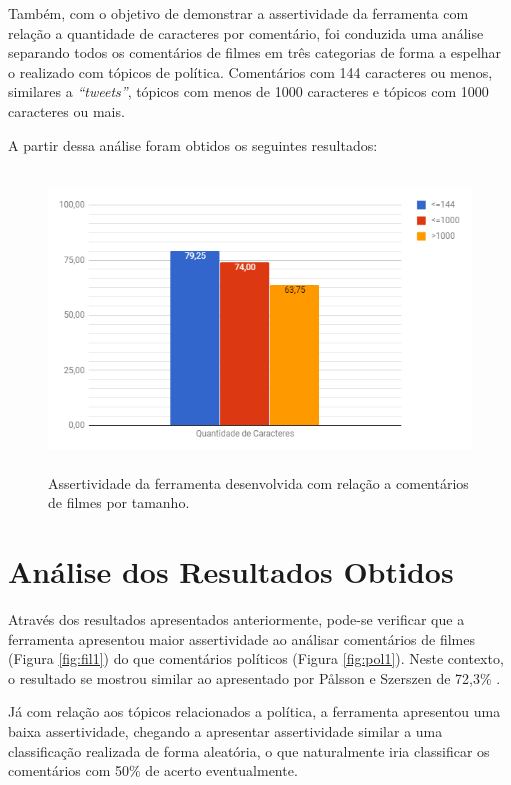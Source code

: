 Também, com o objetivo de demonstrar a assertividade da ferramenta com relação a
quantidade de caracteres por comentário, foi conduzida uma análise separando
todos os comentários de filmes em três categorias de forma a espelhar o
realizado com tópicos de política. Comentários com 144 caracteres ou menos,
similares a \textit{``tweets''}, tópicos com menos de 1000 caracteres e tópicos com 1000 caracteres ou mais. 

\newpage 
A partir dessa análise foram obtidos os seguintes
resultados:

\begin{figure}[!htbp]
\centering
\includegraphics[height=300px]{imagens/filmes2.png}
\caption{Assertividade da ferramenta desenvolvida com relação a comentários de
filmes por tamanho.}
\label{fig:fil2}
\end{figure}

\section{Análise dos Resultados Obtidos}

Através dos resultados
apresentados anteriormente, pode-se verificar que a ferramenta apresentou maior
assertividade ao análisar comentários de filmes (Figura \ref{fig:fil1}) do
que comentários políticos (Figura \ref{fig:pol1}).
Neste contexto, o resultado se mostrou similar ao apresentado por Pålsson e
Szerszen de 72,3\% \cite{SentimentinSocialMedia}.

Já com relação aos tópicos relacionados a política, a ferramenta
apresentou uma baixa assertividade, chegando a apresentar assertividade similar
a uma classificação realizada de forma aleatória, o que naturalmente iria
classificar os comentários com 50\% de acerto eventualmente.

